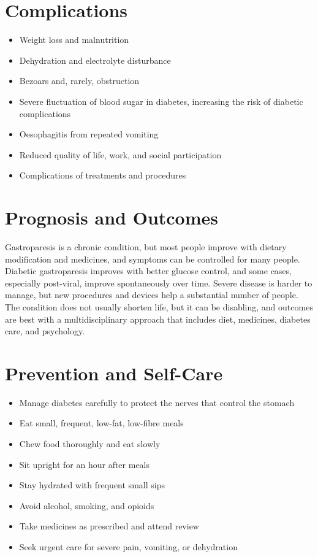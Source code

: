 \section*{Complications}
\begin{itemize}
    \item Weight loss and malnutrition
    \item Dehydration and electrolyte disturbance
    \item Bezoars and, rarely, obstruction
    \item Severe fluctuation of blood sugar in diabetes, increasing the risk of diabetic complications
    \item Oesophagitis from repeated vomiting
    \item Reduced quality of life, work, and social participation
    \item Complications of treatments and procedures
\end{itemize}

\section*{Prognosis and Outcomes}
Gastroparesis is a chronic condition, but most people improve with dietary modification and medicines, and symptoms can be controlled for many people. Diabetic gastroparesis improves with better glucose control, and some cases, especially post-viral, improve spontaneously over time. Severe disease is harder to manage, but new procedures and devices help a substantial number of people. The condition does not usually shorten life, but it can be disabling, and outcomes are best with a multidisciplinary approach that includes diet, medicines, diabetes care, and psychology.

\section*{Prevention and Self-Care}
\begin{itemize}
    \item Manage diabetes carefully to protect the nerves that control the stomach
    \item Eat small, frequent, low-fat, low-fibre meals
    \item Chew food thoroughly and eat slowly
    \item Sit upright for an hour after meals
    \item Stay hydrated with frequent small sips
    \item Avoid alcohol, smoking, and opioids
    \item Take medicines as prescribed and attend review
    \item Seek urgent care for severe pain, vomiting, or dehydration
\end{itemize}

